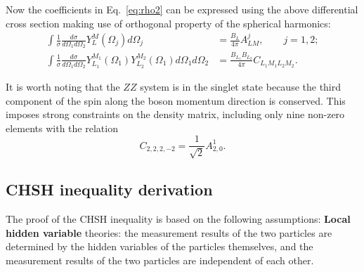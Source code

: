 \documentclass{article}
\begin{document}
Now the coefficients in Eq.~\ref{eq:rho2} can be expressed using the above differential cross section making use of orthogonal property of the spherical harmonics:
\begin{align}
    \int \frac{1}{\sigma}\frac{d\sigma}{d\Omega_1d\Omega_2}Y_L^M(\Omega_j)d\Omega_j&=\frac{B_L}{4\pi}A_{LM}^j, \qquad j=1,2;\\
    \int \frac{1}{\sigma}\frac{d\sigma}{d\Omega_1d\Omega_2}Y_{L_1}^{M_1}(\Omega_1)Y_{L_2}^{M_2}(\Omega_1)d\Omega_1d\Omega_2 &= \frac{B_{L_1}B_{L_2}}{4\pi}C_{L_1M_1L_2M_2}.
\end{align}

It is worth noting that the $ZZ$ system is in the singlet state because the third component of the spin along the boson momentum direction is conserved. This imposes strong constraints on the density matrix, including only nine non-zero elements with the relation
\begin{equation}
    C_{2,2,2,-2} = \frac{1}{\sqrt{2}}A_{2, 0}^1.
\end{equation}

\subsection{CHSH inequality derivation}

The proof\cite{clauser1974experimental} of the CHSH inequality is based on the following assumptions: \textbf{Local hidden variable} theories: the measurement results of the two particles are determined by the hidden variables of the particles themselves, and the measurement results of the two particles are independent of each other.
\end{document}
